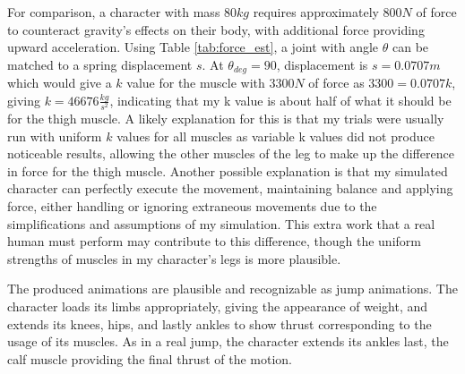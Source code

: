For comparison, a character with mass $80kg$ requires approximately $800N$ of force to counteract gravity's effects on their body, with additional force providing upward acceleration.  Using Table \ref{tab:force_est}, a joint with angle $\theta$ can be matched to a spring displacement $s$.  At $\theta_{deg} = 90$, displacement is $s=0.0707m$ which would give a $k$ value for the muscle with $3300N$ of force as $3300 = 0.0707k$, giving $k = 46676\frac{kg}{s^2}$, indicating that my k value is about half of what it should be for the thigh muscle.  A likely explanation for this is that my trials were usually run with uniform $k$ values for all muscles as variable k values did not produce noticeable results, allowing the other muscles of the leg to make up the difference in force for the thigh muscle.  Another possible explanation is that my simulated character can perfectly execute the movement, maintaining balance and applying force, either handling or ignoring extraneous movements due to the simplifications and assumptions of my simulation.  This extra work that a real human must perform may contribute to this difference, though the uniform strengths of muscles in my character's legs is more plausible.

The produced animations are plausible and recognizable as jump animations.  The character loads its limbs appropriately, giving the appearance of weight, and extends its knees, hips, and lastly ankles to show thrust corresponding to the usage of its muscles.  As in a real jump, the character extends its ankles last, the calf muscle providing the final thrust of the motion.


